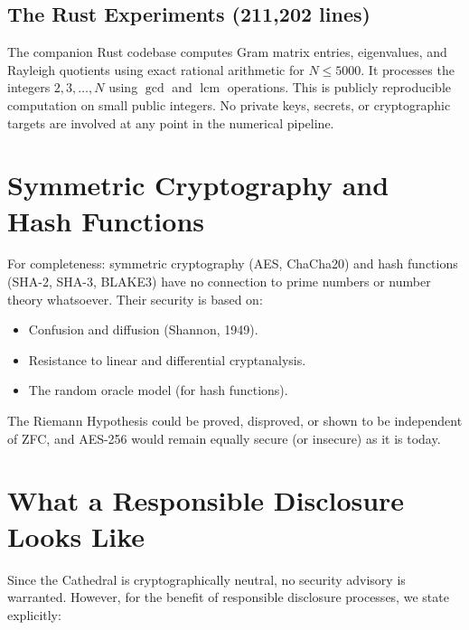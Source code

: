 \documentclass[11pt,a4paper]{article}
\theoremstyle{definition}
\theoremstyle{plain}
\begin{document}
\subsection{The Rust Experiments (211,202 lines)}

The companion Rust codebase computes Gram matrix entries, eigenvalues,
and Rayleigh quotients using exact rational arithmetic for
$N \leq 5000$. It processes the integers $2, 3, \ldots, N$
using $\gcd$ and $\operatorname{lcm}$ operations. This is publicly
reproducible computation on small public integers. No private keys,
secrets, or cryptographic targets are involved at any point in the
numerical pipeline.

\section{Symmetric Cryptography and Hash Functions}
\label{sec:symmetric}

For completeness: symmetric cryptography (AES, ChaCha20) and hash
functions (SHA-2, SHA-3, BLAKE3) have no connection to prime numbers
or number theory whatsoever. Their security is based on:

\begin{itemize}
  \item Confusion and diffusion (Shannon, 1949).
  \item Resistance to linear and differential cryptanalysis.
  \item The random oracle model (for hash functions).
\end{itemize}

The Riemann Hypothesis could be proved, disproved, or shown to be
independent of ZFC, and AES-256 would remain equally secure (or
insecure) as it is today.

\section{What a Responsible Disclosure Looks Like}
\label{sec:disclosure}

Since the Cathedral is cryptographically neutral, no security
advisory is warranted. However, for the benefit of responsible
disclosure processes, we state explicitly:
\end{document}

